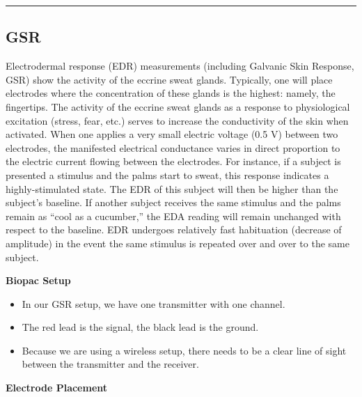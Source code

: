 \documentclass[]{book}
\providecommand{\tightlist}{%
  \setlength{\itemsep}{0pt}\setlength{\parskip}{0pt}}
\begin{document}
\begin{center}\rule{0.5\linewidth}{0.5pt}\end{center}

\subsection{GSR}\label{gsr}

Electrodermal response (EDR) measurements (including Galvanic Skin
Response, GSR) show the activity of the eccrine sweat glands. Typically,
one will place electrodes where the concentration of these glands is the
highest: namely, the fingertips. The activity of the eccrine sweat
glands as a response to physiological excitation (stress, fear, etc.)
serves to increase the conductivity of the skin when activated. When one
applies a very small electric voltage (0.5 V) between two electrodes,
the manifested electrical conductance varies in direct proportion to the
electric current flowing between the electrodes. For instance, if a
subject is presented a stimulus and the palms start to sweat, this
response indicates a highly-stimulated state. The EDR of this subject
will then be higher than the subject's baseline. If another subject
receives the same stimulus and the palms remain as ``cool as a
cucumber,'' the EDA reading will remain unchanged with respect to the
baseline. EDR undergoes relatively fast habituation (decrease of
amplitude) in the event the same stimulus is repeated over and over to
the same subject.

\textbf{Biopac Setup}

\begin{itemize}
\tightlist
\item
  In our GSR setup, we have one transmitter with one channel.
\item
  The red lead is the signal, the black lead is the ground.
\item
  Because we are using a wireless setup, there needs to be a clear line
  of sight between the transmitter and the receiver.
\end{itemize}

\textbf{Electrode Placement}
\end{document}
